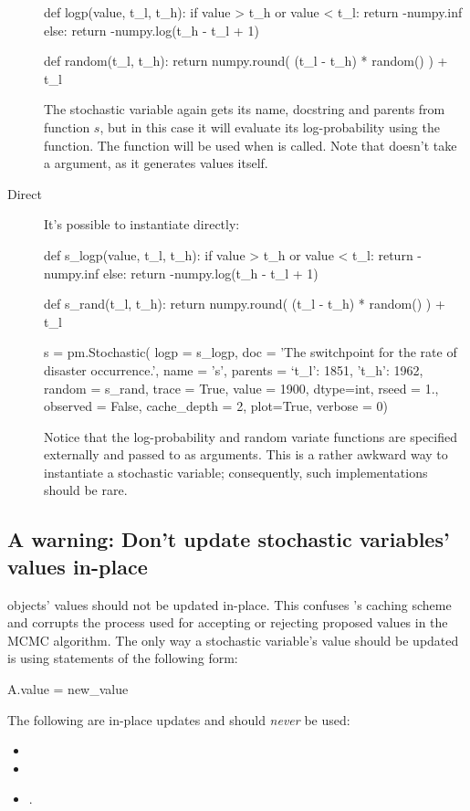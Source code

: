 \documentclass[]{jss}
\begin{document}
\begin{description}
\begin{CodeInput}
def logp(value, t_l, t_h):
    if value > t_h or value < t_l:
        return -numpy.inf
    else:
        return -numpy.log(t_h - t_l + 1)

def random(t_l, t_h):
    return numpy.round( (t_l - t_h) * random() ) + t_l

\end{CodeInput}
The stochastic variable again gets its name, docstring and parents from function $s$, but in this case it will evaluate its log-probability using the  function. The  function will be used when  is called. Note that  doesn't take a  argument, as it generates values itself.

    \item[Direct] It's possible to instantiate  directly:
\begin{CodeInput}
def s_logp(value, t_l, t_h):
if value > t_h or value < t_l:
    return -numpy.inf
else:
    return -numpy.log(t_h - t_l + 1)

def s_rand(t_l, t_h):
return numpy.round( (t_l - t_h) * random() ) + t_l

s = pm.Stochastic( logp = s_logp,
            doc = 'The switchpoint for the rate of disaster occurrence.',
            name = 's',
            parents = {`t_l': 1851, 't_h': 1962},
            random = s_rand,
            trace = True,
            value = 1900,
            dtype=int,
            rseed = 1.,
            observed = False,
            cache_depth = 2,
            plot=True,
            verbose = 0)
\end{CodeInput}
Notice that the log-probability and random variate functions are specified externally and passed to  as arguments. This is a rather awkward way to instantiate a stochastic variable; consequently, such implementations should be rare.

\end{description}

\subsection{A warning: Don't update stochastic variables' values in-place}


 objects' values should not be updated in-place. This confuses 's caching scheme and corrupts the process used for accepting or rejecting proposed values in the MCMC algorithm. The only way a stochastic variable's value should be updated is using statements of the following form:
\begin{CodeInput}
A.value = new_value
\end{CodeInput}
The following are in-place updates and should \emph{never} be used:
\begin{itemize}
    \item {}
    \item {}
    \item {}.
\end{itemize}
\end{document}
